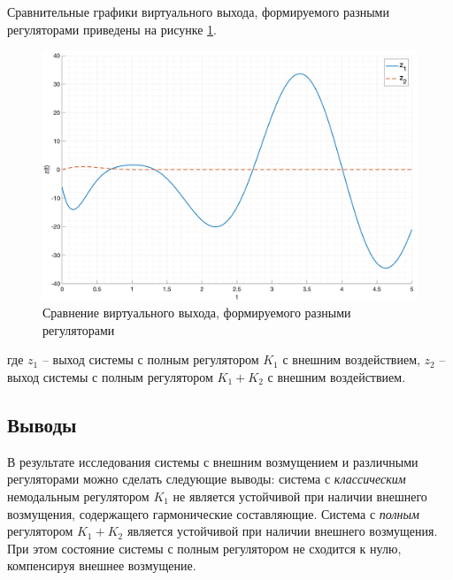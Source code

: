 Сравнительные графики виртуального выхода, формируемого разными регуляторами приведены на рисунке \ref{fig:compare_z}.
\begin{figure}[ht!]
    \centering
    \includegraphics[width=\textwidth]{media/plots/z_cmp.png}
    \caption{Сравнение виртуального выхода, формируемого разными регуляторами}
    \label{fig:compare_z}
\end{figure}
где $z_1$ -- выход системы с полным регулятором $K_1$ с внешним воздействием, $z_2$ -- выход системы с полным регулятором $K_1 + K_2$ с внешним воздействием.
\FloatBarrier

\subsection{Выводы}
В результате исследования системы с внешним возмущением и различными регуляторами
можно сделать следующие выводы: система с \textit{классическим} немодальным регулятором
$K_1$ не является устойчивой при наличии внешнего возмущения, содержащего гармонические
составляющие. Система с \textit{полным} регулятором $K_1 + K_2$ является устойчивой при наличии 
внешнего возмущения. При этом состояние системы с полным регулятором не сходится к нулю,
компенсируя внешнее возмущение. 